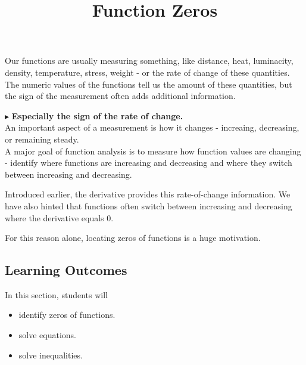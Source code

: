 \documentclass{ximera}
\title{Function Zeros}
\begin{document}
\begin{abstract}
\end{abstract}
\maketitle




Our functions are usually measuring something, like distance, heat, luminacity, density, temperature, stress, weight - or the rate of change of these quantities.  The numeric values of the functions tell us the amount of these quantities, but the sign of the measurement often adds additional information. 


$\blacktriangleright$ \textbf{\textcolor{blue!55!black}{Especially the sign of the rate of change.}}   \\



An important aspect of a measurement is how it changes - increaing, decreasing, or remaining steady. \\





A major goal of function analysis is to measure how function values are changing - identify where functions are increasing and decreasing and where they switch between increasing and decreasing.




Introduced earlier, the derivative provides this rate-of-change information.  We have also hinted that functions often switch between increasing and decreasing where the derivative equals $0$.

For this reason alone, locating zeros of functions is a huge motivation.







\subsection{Learning Outcomes}


\begin{sectionOutcomes}
In this section, students will 

\begin{itemize}
\item identify zeros of functions.
\item solve equations.
\item solve inequalities.
\end{itemize}
\end{sectionOutcomes}
\end{document}
